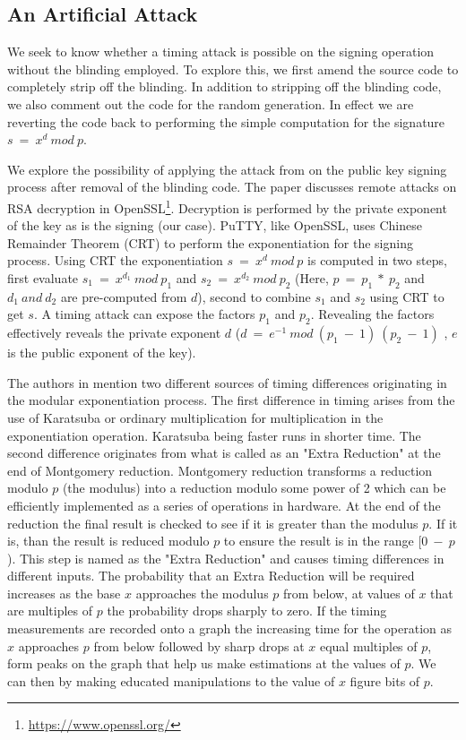 \documentclass{bhamthesis}
\begin{document}
\subsection{An Artificial Attack}
We seek to know whether a timing attack is possible on the signing operation without the blinding employed. To explore this, we first amend the source code to completely strip off the blinding. In addition to stripping off the blinding code, we also comment out the code for the random generation. In effect we are reverting the code back to performing the simple computation for the signature \(s\ =\ x^d\ mod\ p\).\par
We explore the possibility of applying the attack from \cite{brumley} on the public key signing process after removal of the blinding code. The paper discusses remote attacks on RSA decryption in OpenSSL\footnote{\url{https://www.openssl.org/}}. Decryption is performed by the private exponent of the key as is the signing (our case). PuTTY, like OpenSSL, uses Chinese Remainder Theorem (CRT) to perform the exponentiation for the signing process. Using CRT the exponentiation \(s\ =\ x^d\ mod\ p\) is computed in two steps, first evaluate \(s_1\ =\ x^{d_1} \ mod\ p_1\) and \(s_2\ =\ x^{d_2} \ mod\ p_2\) (Here, \(p\ =\ p_1\ *\ p_2\) and \(d_1\ and\ d_2\) are pre-computed from \(d\)), second to combine \(s_1\) and \(s_2\) using CRT to get \(s\). A timing attack can expose the factors \(p_1\) and \(p_2\). Revealing the factors effectively reveals the private exponent \(d\) (\(d\ =\ e^{-1}\ mod\ ({p_1}\ -\ 1 )\ ({p_2}\ -\ 1)\) , \(e\) is the public exponent of the key). \par
The authors in \cite{brumley} mention two different sources of timing differences originating in the modular exponentiation process. The first difference in timing arises from the use of Karatsuba or ordinary multiplication for multiplication in the exponentiation operation. Karatsuba being faster runs in shorter time. The second difference originates from what is called as an "Extra Reduction" at the end of Montgomery reduction. Montgomery reduction transforms a reduction modulo \(p\) (the modulus) into a reduction modulo some power of 2 which can be efficiently implemented as a series of operations in hardware. At the end of the reduction the final result is checked to see if it is greater than the modulus \(p\). If it is, than the result is reduced modulo \(p\) to ensure the result is in the range [\(0\ -\ p\)). This step is named as the "Extra Reduction" and causes timing differences in different inputs. The probability that an Extra Reduction will be required increases as the base \(x\) approaches the modulus \(p\) from below, at values of \(x\) that are multiples of \(p\) the probability drops sharply to zero. If the timing measurements are recorded onto a graph the increasing time for the operation  as \(x\) approaches \(p\) from below followed by sharp drops at \(x\) equal multiples of \(p\), form peaks on the graph that help us make estimations at the values of \(p\). We can then by making educated manipulations to the value of \(x\) figure bits of \(p\).
\end{document}
